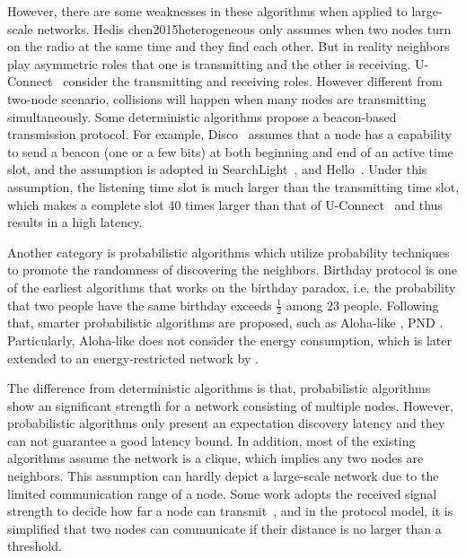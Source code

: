 However, there are some weaknesses in these algorithms when applied to large-scale networks.
Hedis {chen2015heterogeneous} only assumes when two nodes turn on the radio at the same time and they find each other. 
But in reality neighbors play asymmetric roles that one is transmitting and the other is receiving.
U-Connect~\cite{kandhalu2010u} consider the transmitting and receiving roles.
However different from two-node scenario, collisions will happen when many nodes are transmitting simultaneously. 
Some deterministic algorithms propose a beacon-based transmission protocol.
For example, Disco~\cite{dutta2008practical} assumes that a node has a capability to send a beacon (one or a few bits) at both beginning and end of an active time slot, and the assumption is adopted in 
SearchLight~\cite{bakht2012searchlight}, and Hello~\cite{sun2014hello}.
Under this assumption, the listening time slot is much larger than the transmitting time slot, which makes a complete slot 
40 times larger than that of U-Connect~\cite{kandhalu2010u} and thus results in a high latency.


Another category is probabilistic algorithms \cite{mcglynn2001birthday,
vasudevan2009neighbor,you2011aloha,song2014probabilistic} which utilize probability techniques to promote the randomness
of discovering the neighbors. 
Birthday protocol \cite{mcglynn2001birthday} is one of the earliest algorithms that works on the birthday
paradox, i.e. the probability that two people have the same
birthday exceeds $\frac{1}{2}$ among $23$ people. Following that,
smarter probabilistic algorithms are proposed, such as Aloha-like \cite{vasudevan2009neighbor, you2011aloha}, PND \cite{song2014probabilistic}. Particularly, Aloha-like \cite{vasudevan2009neighbor} does not consider the energy consumption, which is later extended to an energy-restricted network by \cite{you2011aloha}.

The difference from deterministic algorithms is that,
probabilistic algorithms show an significant strength for a network consisting of multiple nodes.
However, probabilistic algorithms only present an expectation discovery latency and they
can not guarantee a good latency bound.
In addition, most of the existing algorithms assume the network is a clique, which implies any two nodes are neighbors. 
This assumption can hardly depict a large-scale network due to the limited communication range of a node.
Some work adopts the received signal strength to decide how far a node can transmit~\cite{daiya2011experimental}, and in the protocol model, it is simplified that two nodes can communicate if their distance is no larger than a threshold.


